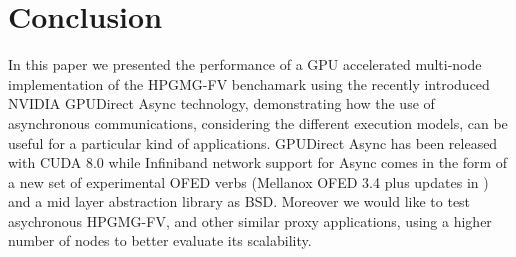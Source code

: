 \documentclass[review]{siamart1116}
\begin{document}
%




\section{Conclusion}

In this paper we presented the performance of a GPU accelerated multi-node
implementation of the HPGMG-FV benchamark using the recently introduced
NVIDIA GPUDirect Async technology, demonstrating how the use of asynchronous communications,
considering the different execution models, can be useful for a particular kind of applications.
% 
GPUDirect Async has been
released with CUDA 8.0 while Infiniband network support for
Async comes in the form of a new set of experimental
OFED verbs (Mellanox OFED 3.4 plus updates in \cite{libmlx5_async})
and a mid layer abstraction library \cite{libgdsync} as BSD.
%
Moreover we would like to test
asychronous HPGMG-FV, and other similar proxy applications, using a higher number of nodes to
better evaluate its scalability.
\end{document}

